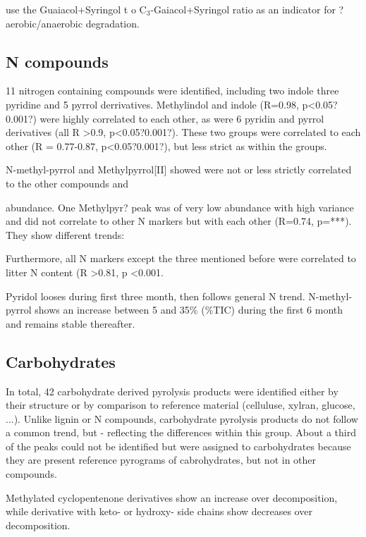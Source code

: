 \documentclass[preprint,review,12pt]{elsarticle}
\begin{document}
\cite{Kuder1998, Schellekens2009} use the Guaiacol+Syringol t o C$_3$-Gaiacol+Syringol ratio as an indicator for ?aerobic/anaerobic degradation. 

\subsection{N compounds}

11 nitrogen containing compounds were identified, including two indole three pyridine and 5 pyrrol derrivatives. Methylindol and indole (R=0.98, p\textless 0.05?0.001?) were highly correlated to each other, as were 6 pyridin and pyrrol derivatives (all R \textgreater 0.9, p\textless 0.05?0.001?). These two groups were correlated to each other (R = 0.77-0.87, p\textless 0.05?0.001?), but less strict as within the groups. 

N-methyl-pyrrol and Methylpyrrol[II] showed were not or less strictly correlated to the other compounds and 


 abundance. One Methylpyr? peak was of very low abundance with high variance and did not correlate to other N markers but with each other (R=0.74, p=***). They show different trends:



Furthermore, all N markers except the three mentioned before were correlated to litter N content (R \textgreater 0.81, p \textless 0.001.


Pyridol looses during first three month, then follows general N trend. 
N-methyl-pyrrol shows an increase between 5 and 35\% (\%TIC) during the first 6 month and remains stable thereafter.


\subsection{Carbohydrates}
In total, 42 carbohydrate derived pyrolysis products were identified either by their structure or by comparison to reference material (celluluse, xylran, glucose, ...). Unlike lignin or N compounds, carbohydrate pyrolysis products do not follow a common trend, but - reflecting the differences within this group. About a third of the peaks could not be identified but were assigned to carbohydrates because they are present reference pyrograms of cabrohydrates, but not in other compounds.

Methylated cyclopentenone derivatives show an increase over decomposition, while derivative with keto- or hydroxy- side chains show decreases over decomposition.
\end{document}
